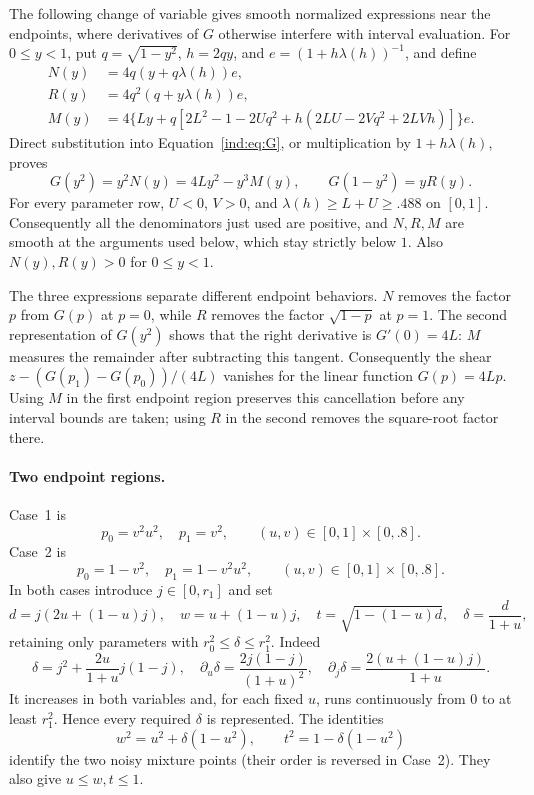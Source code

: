 The following change of variable gives smooth normalized expressions
near the endpoints, where derivatives of $G$ otherwise interfere with
interval evaluation.  For $0\leq y<1$, put
$q=\sqrt{1-y^2}$, $h=2qy$, and $e=(1+h\lambda(h))^{-1}$, and define
\begin{align}
 N(y)&=4q(y+q\lambda(h))e,\nonumber\\
 R(y)&=4q^2(q+y\lambda(h))e,\label{sc:NRM}\\
 M(y)&=4\bigl\{Ly+q[2L^2-1-2Uq^2
             +h(2LU-2Vq^2+2LVh)]\bigr\}e.\nonumber
\end{align}
Direct substitution into Equation~\eqref{ind:eq:G}, or multiplication by
$1+h\lambda(h)$, proves
\begin{equation}\label{sc:representations}
 G(y^2)=y^2N(y)=4Ly^2-y^3M(y),
 \qquad G(1-y^2)=yR(y).
\end{equation}
For every parameter row, $U<0$, $V>0$, and
$\lambda(h)\geq L+U\geq.488$ on $[0,1]$.
Consequently all the denominators just used are positive, and $N,R,M$
are smooth at the arguments used below, which stay strictly below $1$.
Also $N(y),R(y)>0$ for $0\leq y<1$.

The three expressions separate different endpoint behaviors.
$N$ removes the factor $p$ from $G(p)$ at $p=0$, while $R$ removes
the factor $\sqrt{1-p}$ at $p=1$.
The second representation of $G(y^2)$ shows that the right derivative is $G'(0)=4L$:
$M$ measures the remainder after subtracting this tangent.
Consequently the shear
$z-(G(p_1)-G(p_0))/(4L)$ vanishes for the linear function $G(p)=4Lp$.
Using $M$ in the first endpoint region preserves this cancellation
before any interval bounds are taken; using $R$ in the second removes
the square-root factor there.

\paragraph{Two endpoint regions.}
Case~1 is
\[
 p_0=v^2u^2,\quad p_1=v^2,\qquad
 (u,v)\in[0,1]\times[0,.8].
\]
Case~2 is
\[
 p_0=1-v^2,\quad p_1=1-v^2u^2,\qquad
 (u,v)\in[0,1]\times[0,.8].
\]
In both cases introduce $j\in[0,r_1]$ and set
\begin{equation}\label{sc:uwt}
 d=j(2u+(1-u)j),\quad w=u+(1-u)j,\quad
 t=\sqrt{1-(1-u)d},\quad \delta=\frac d{1+u},
\end{equation}
retaining only parameters with $r_0^2\leq\delta\leq r_1^2$.
Indeed
\[
 \delta=j^2+\frac{2u}{1+u}j(1-j),\quad
 \partial_u\delta=\frac{2j(1-j)}{(1+u)^2},\quad
 \partial_j\delta=\frac{2(u+(1-u)j)}{1+u}.
\]
It increases in both variables and, for each fixed $u$, runs continuously
from $0$ to at least $r_1^2$.  Hence every required $\delta$ is represented.
The identities
\[
 w^2=u^2+\delta(1-u^2),\qquad
 t^2=1-\delta(1-u^2)
\]
identify the two noisy mixture points (their order is reversed in
Case~2).  They also give $u\leq w,t\leq1$.

